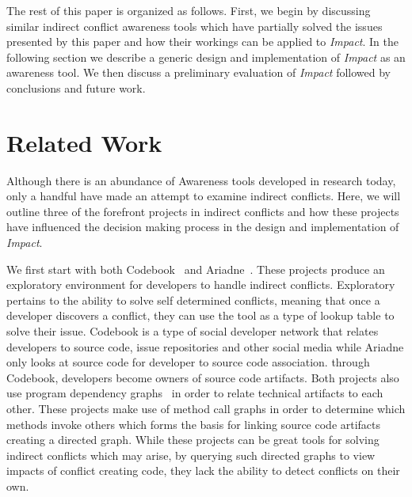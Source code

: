 \documentclass[conference]{IEEEtran}
\begin{document}
The rest of this paper is organized as follows. First, we begin by discussing
similar indirect conflict awareness tools which have partially solved the
issues presented by this paper and how their workings can be applied to 
\textit{Impact}. In the following section we describe a generic design and implementation
of \textit{Impact} as an awareness tool. We then discuss a preliminary evaluation of
\textit{Impact} followed by conclusions and future work.


\section{Related Work}
Although there is an abundance of Awareness tools developed in research
today, only a handful have made an attempt to examine indirect conflicts.
Here, we will outline three of the forefront projects in indirect conflicts
and how these projects have influenced the decision making process in
the design and implementation of \textit{Impact}.

We first start with both Codebook~\cite{Begel:2010:CDE} and 
Ariadne~\cite{Trainer:2005:BGT}. These projects produce an exploratory
environment for developers to handle indirect conflicts. Exploratory
pertains to the ability to solve self determined conflicts, meaning that
once a developer discovers a conflict, they can use the tool as a type of
lookup table to solve their issue. Codebook is a type of social developer
network that relates developers to source code, issue repositories and
other social media while Ariadne only looks at source code for developer
to source code association. through Codebook, developers become
owners of source code artifacts. Both projects also use program 
dependency graphs~\cite{Horwitz:1992:UPD}
in order to relate technical artifacts to each other. These projects make 
use of method call graphs in order to 
determine which methods invoke others which forms the basis for 
linking source code artifacts creating a directed graph. While these 
projects can be great tools 
for solving indirect conflicts which may arise, by querying such directed
graphs to view impacts of conflict creating code, they lack the ability to
detect conflicts on their own.
\end{document}
